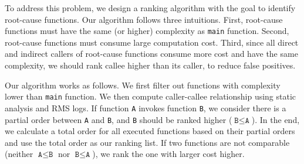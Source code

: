 To address this problem, we design a ranking algorithm 
with the goal to identify root-cause functions. 
Our algorithm follows three intuitions. 
First, root-cause functions must have the same (or higher) 
complexity as \texttt{main} function.
Second, root-cause functions must consume large computation cost.
Third, since all direct and indirect callers of root-cause functions 
consume more cost and have the same complexity, 
we should rank callee higher than its caller, 
to reduce false positives. 

Our algorithm works as follows. 
We first filter out functions with complexity lower than \texttt{main} function.
We then compute caller-callee relationship using static analysis and RMS logs. 
If function \texttt{A} invokes function \texttt{B}, 
we consider there is a partial order between \texttt{A} and \texttt{B},
and \texttt{B} should be ranked higher ($\texttt{B} \leq \texttt{A}$). 
In the end, we calculate a total order for all executed functions based 
on their partial orders and use the total order as our ranking list. 
If two functions are not comparable 
(neither $\texttt{A} \leq \texttt{B}$ nor $\texttt{B} \leq \texttt{A}$), 
we rank the one with larger cost higher. 

